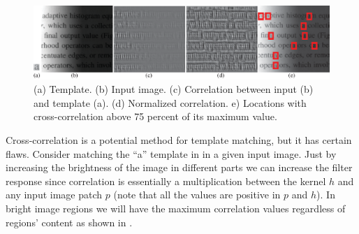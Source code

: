 \begin{figure}[t]
\includegraphics[width=1\linewidth]{figures/linear_image_filtering/normcorr.eps}
\caption{(a) Template. (b) Input image. (c) Correlation between input (b) and template (a). (d) Normalized correlation. e) Locations with cross-correlation above 75 percent of its maximum value.
} 
\label{fig:normcorr}
\end{figure}


Cross-correlation is a potential method for template matching, but it has certain flaws. Consider matching the ``a'' template in  in a given input image. Just by increasing the brightness of the image in different parts we can increase the filter response since correlation is essentially a multiplication between the kernel $h$ and any input image patch $p$  (note that all the values are positive in $p$ and $h$). In bright image regions we will have the maximum correlation values regardless of regions' content as shown in . 

